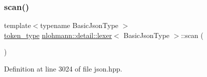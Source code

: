 \subsubsection{\texorpdfstring{scan()}{scan()}}
{\footnotesize\ttfamily template$<$typename Basic\+Json\+Type $>$ \\
\hyperlink{classnlohmann_1_1detail_1_1lexer_a3f313cdbe187cababfc5e06f0b69b098}{token\+\_\+type} \hyperlink{classnlohmann_1_1detail_1_1lexer}{nlohmann\+::detail\+::lexer}$<$ Basic\+Json\+Type $>$\+::scan (\begin{DoxyParamCaption}{ }\end{DoxyParamCaption})\hspace{0.3cm}{\ttfamily [inline]}}



Definition at line 3024 of file json.\+hpp.


